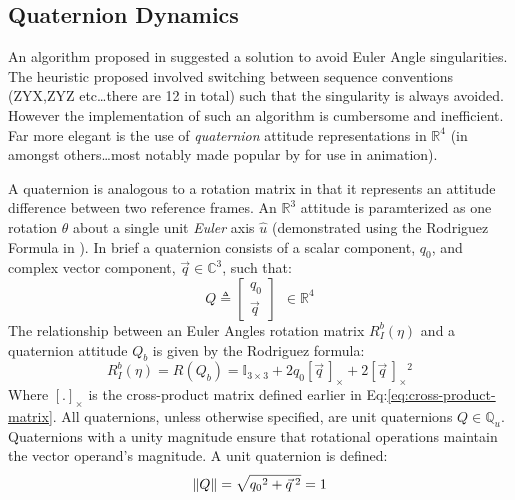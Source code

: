 \subsection{Quaternion Dynamics}
\label{subsec:dynamics.rigidbody.quaternion}
An algorithm proposed in \cite{euleranglesingularity} suggested a solution to avoid Euler Angle singularities. The heuristic proposed involved switching between sequence conventions (ZYX,ZYZ etc\ldots there are 12 in total) such that the singularity is always avoided. However the implementation of such an algorithm is cumbersome and inefficient. Far more elegant is the use of \emph{quaternion} attitude representations in $\mathbb{R}^4$ (in \cite{rotationsequences,quaterniondynamics,spacecraftattitutdequaternions} amongst others\ldots most notably made popular by \cite{shoemake} for use in animation).
\par
A quaternion is analogous to a rotation matrix in that it represents an attitude difference between two reference frames. An $\mathbb{R}^3$ attitude is paramterized as one rotation $\theta$ about a single unit \emph{Euler} axis $\hat{u}$ (demonstrated using the Rodriguez Formula in \cite{unwinding}). In brief a quaternion consists of a scalar component, $q_0$, and complex vector component, $\vec{q}\in \mathbb{C}^3$, such that:
\begin{equation}
Q\triangleq 
\begin{bmatrix}
q_0 \\
\vec{q}
\end{bmatrix}
~~\in\mathbb{R}^4
\end{equation}
The relationship between an Euler Angles rotation matrix $R_I^b(\eta)$ and a quaternion attitude $Q_b$ is given by the Rodriguez formula:
\begin{equation}\label{eq:rodriguez}
R_I^b(\eta)=R(Q_b)=\mathbb{I}_{3\times 3}+2q_0[\vec{q}\hspace{2pt}]_\times+2[\vec{q}\hspace{2pt}]_\times\text{}^2
\end{equation}
Where $[.]_\times$ is the cross-product matrix defined earlier in Eq:\ref{eq:cross-product-matrix}. All quaternions, unless otherwise specified, are unit quaternions $Q\in\mathbb{Q}_u$. Quaternions with a unity magnitude ensure that rotational operations maintain the vector operand's magnitude. A unit quaternion is defined:
\begin{equation}
\left\lVert Q\right\rVert=\sqrt{{q_0}^2+\vec{q}\text{}\hspace{2pt}^2}=1
\end{equation}
